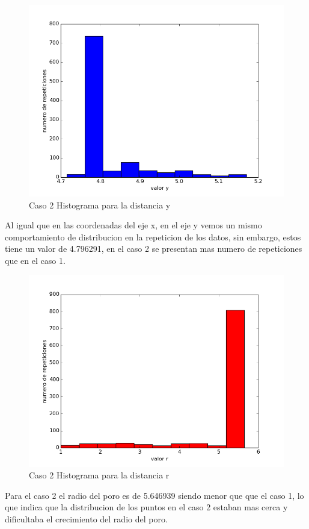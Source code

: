 \documentclass{article}
\begin{document}
\newpage
\begin{figure}[h!]
  \includegraphics[scale=0.5]{histrogramay1.png}
  \caption{Caso 2 Histograma para la distancia y  }
\end{figure}
Al igual que en las coordenadas del eje x, en el eje y vemos un mismo comportamiento de distribucion en la repeticion de los datos, sin embargo, estos tiene un valor de 4.796291, en el caso 2 se presentan mas numero de repeticiones que en el caso 1. \\


\newpage
\begin{figure}[h!]
  \includegraphics[scale=0.5]{histrogramar1.png}
  \caption{Caso 2 Histograma para la distancia r  }
\end{figure}
Para el caso 2 el radio del poro es de 5.646939 siendo menor que que el caso 1, lo que indica que la distribucion de los puntos en el caso 2 estaban mas cerca y dificultaba el crecimiento del radio del poro.  \\
\end{document}
